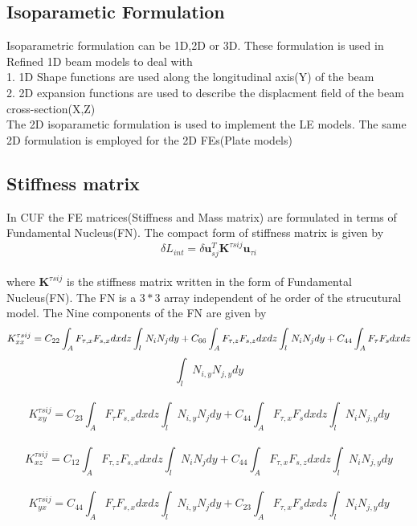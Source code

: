 \documentclass[a4paper,12pt]{article}
\begin{document}
\newpage
\subsection*{Isoparametic Formulation}
\indent\indent\indent\indent Isoparametric formulation can be 1D,2D or 3D. These formulation is used in Refined 1D beam models to deal with\\
1. 1D Shape functions are used along the longitudinal axis(Y) of the beam\\
2. 2D expansion functions are used to describe the displacment field of the beam cross-section(X,Z)\\
The 2D isoparametic formulation is used to implement the LE models. The same 2D formulation is employed for the 2D FEs(Plate models)

\subsection*{Stiffness matrix}
\indent\indent\indent\indent In CUF the FE matrices(Stiffness and Mass matrix) are formulated in terms of Fundamental Nucleus(FN). The compact form of stiffness matrix is given by $$\delta L_{int} = \delta \textbf{u}_{sj}^{T} \textbf{K}^{\tau s i j} \textbf{u}_{\tau i}  $$ \\ where $\textbf{K}^{\tau s i j}$ is the stiffness matrix written in the form of Fundamental Nucleus(FN). The FN is a $3*3$ array independent of he order of the strucutural model. The Nine components of the FN are given by\\
$$K_{xx}^{\tau s i j} = C_{22} \int_{A}^{} F_{\tau,x} F_{s,x} dx dz \int_{l}^{} N_{i} N_{j} dy + C_{66} \int_{A}^{} F_{\tau,z} F_{s,z} dx dz \int_{l}^{} N_{i} N_{j} dy + C_{44} \int_{A}^{} F_{\tau} F_{s} dx dz\\$$ $$\int_{l}^{} N_{i,y} N_{j,y} dy $$\\
$$ K_{xy}^{\tau s i j} = C_{23} \int_{A}^{} F_{\tau} F_{s,x} dx dz \int_{l}^{} N_{i,y} N_{j} dy + C_{44} \int_{A}^{} F_{\tau,x} F_{s} dx dz \int_{l}^{} N_{i} N_{j,y} dy$$\\
$$ K_{xz}^{\tau s i j} = C_{12} \int_{A}^{} F_{\tau,z} F_{s,x} dx dz \int_{l}^{} N_{i} N_{j} dy + C_{44} \int_{A}^{} F_{\tau,x} F_{s,z} dx dz \int_{l}^{} N_{i} N_{j,y} dy$$\\
$$ K_{yx}^{\tau s i j} = C_{44} \int_{A}^{} F_{\tau} F_{s,x} dx dz \int_{l}^{} N_{i,y} N_{j} dy + C_{23} \int_{A}^{} F_{\tau,x} F_{s} dx dz \int_{l}^{} N_{i} N_{j,y} dy$$\\
\\
\end{document}
